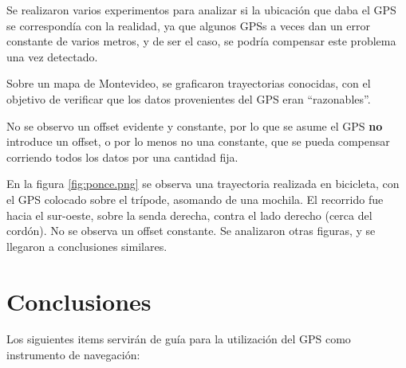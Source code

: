 \documentclass[spanish,12pt,a4paper,titlepage]{report}
\begin{document}
Se realizaron varios experimentos para analizar si la ubicación que daba el GPS se correspondía con la realidad, ya que algunos GPSs a veces dan un error constante de varios metros, y de ser el caso, se podría compensar este problema una vez detectado.

Sobre un mapa de Montevideo, se graficaron trayectorias conocidas, con el objetivo de verificar que los datos provenientes del GPS eran ``razonables''.

No se observo un offset evidente y constante, por lo que se asume el GPS \textbf{no} introduce un offset, o por lo menos no una constante, que se pueda compensar corriendo todos los datos por una cantidad fija.

En la figura \ref{fig:ponce.png} se observa una trayectoria realizada en bicicleta, con el GPS colocado sobre el trípode, asomando de una mochila. El recorrido fue hacia el sur-oeste, sobre la senda derecha, contra el lado derecho (cerca del cordón). No se observa un offset constante. Se analizaron otras figuras, y se llegaron a conclusiones similares.

\newpage
\section{Conclusiones}
\label{sec:conclusion}

Los siguientes items servirán de guía para la utilización del GPS como instrumento de navegación:
\end{document}
